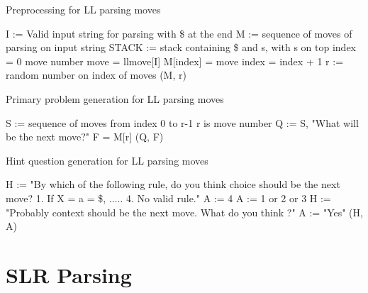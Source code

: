 \begin{algorithm}
\caption{Preprocessing for LL parsing moves}
\label{algo:preprocessing-llmoves}
\begin{algorithmic}[1]
\State I := Valid input string for parsing with \$ at the end
\State M := sequence of moves of parsing on input string
\State STACK := stack containing \$ and s, with s on top
\State index = 0    \Comment move number
\State move = llmove[I]
\State M[index] = move
\State index = index + 1
\EndWhile
\State r := random number on index of moves
\State \Return (M, r)
\EndFunction
\end{algorithmic}
\end{algorithm}

\begin{algorithm}
\caption{Primary problem generation for LL parsing moves}
\label{algo:primary-llmoves}
\begin{algorithmic}[1]
\State S := sequence of moves from index 0 to r-1   \Comment r is move number
\State Q := S, "What will be the next move?"
\State F = M[r]
\State \Return (Q, F)
\EndFunction
\end{algorithmic}
\end{algorithm}

\begin{algorithm}
\caption{Hint question generation for LL parsing moves}
\label{algo:hint-llmoves}
\begin{algorithmic}[1]
\State H := "By which of the following rule, do you think choice should be the next move? 1. If X = a = \$, ..... 4. No valid rule."
\State A := 4
\State A := 1 or 2 or 3
\EndIf
{}
\State H := "Probably context should be the next move. What do you think ?"
\State A := "Yes"
\EndIf
\State \Return (H, A)
\EndFunction
\end{algorithmic}
\end{algorithm}

\section{SLR Parsing}
\label{slrparsing}

